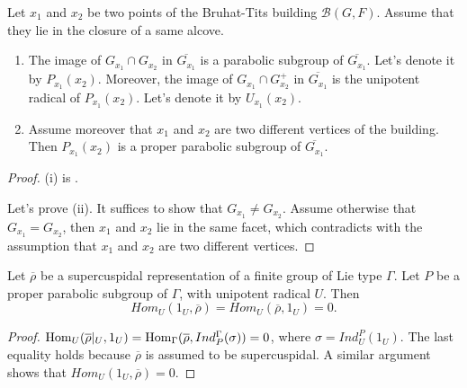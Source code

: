 		
		
		\begin{lemma}\label{Lem Passage to Residue Field}
			Let $x_1$ and $x_2$ be two points of the Bruhat-Tits building $\mathcal{B}(G, F)$. Assume that they lie in the closure of a same alcove.
			\begin{enumerate}
				\item[(i)]   The image of $G_{x_1} \cap G_{x_2}$ in $\overline{G_{x_1}}$ is a parabolic subgroup of $\overline{G_{x_1}}$. Let's denote it by $P_{x_1}(x_2)$. Moreover, the image of $G_{x_1} \cap G_{x_2}^+$ in $\overline{G_{x_1}}$ is the unipotent radical of $P_{x_1}(x_2)$. Let's denote it by $U_{x_1}(x_2)$.
				\item[(ii)] 	Assume moreover that $x_1$ and $x_2$ are two different vertices of the building. Then $P_{x_1}(x_2)$ is a proper parabolic subgroup of $\overline{G_{x_1}}$.
			\end{enumerate}
		\end{lemma}
		
		\begin{proof}
			(i) is \cite[II.5.1.(k)]{vigneras1996representations}.
			
			Let's prove (ii). It suffices to show that $G_{x_1} \neq G_{x_2}$. Assume otherwise that $G_{x_1}=G_{x_2}$, then $x_1$ and $x_2$ lie in the same facet, which contradicts with the assumption that $x_1$ and $x_2$ are two different vertices.
		\end{proof}
		
		\begin{lemma}\label{Lem Hom_U(1_U, SC)}
			Let $\overline{\rho}$ be a supercuspidal representation of a finite group of Lie type $\Gamma$. Let $P$ be a proper parabolic subgroup of $\Gamma$, with unipotent radical $U$. Then
			$$Hom_U(1_U, \overline{\rho})=Hom_U(\overline{\rho}, 1_U)=0.$$
		\end{lemma}
		
		\begin{proof}
			$\operatorname{\operatorname{Hom}}_U(\overline{\rho}|_U, 1_U)=\operatorname{\operatorname{Hom}}_{\Gamma}(\overline{\rho}, Ind_P^{\Gamma}(\sigma))=0$, where $\sigma=Ind_U^P(1_U)$. The last equality holds because $\overline{\rho}$ is assumed to be supercuspidal. A similar argument shows that $Hom_U(1_U, \overline{\rho})=0$.  
			
		\end{proof}
		
